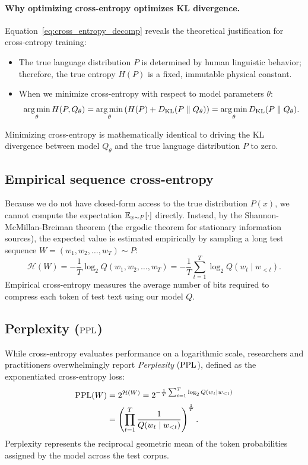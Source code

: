 \documentclass[../../main.tex]{subfiles}
\begin{document}
\paragraph{Why optimizing cross-entropy optimizes KL divergence.}
Equation~\eqref{eq:cross_entropy_decomp} reveals the theoretical justification for cross-entropy training:
\begin{itemize}
    \item The true language distribution $P$ is determined by human linguistic behavior; therefore, the true entropy $H(P)$ is a fixed, immutable physical constant.
    \item When we minimize cross-entropy with respect to model parameters $\theta$:
    \begin{equation}
    \label{eq:mle_equivalence}
    \operatorname*{\mathrm{arg\,min}}_\theta H(P, Q_\theta) = \operatorname*{\mathrm{arg\,min}}_\theta \left( H(P) + D_{\text{KL}}(P \parallel Q_\theta) \right) = \operatorname*{\mathrm{arg\,min}}_\theta D_{\text{KL}}(P \parallel Q_\theta).
    \end{equation}
\end{itemize}
Minimizing cross-entropy is mathematically identical to driving the KL divergence between model $Q_\theta$ and the true language distribution $P$ to zero.

\subsection{Empirical sequence cross-entropy}
Because we do not have closed-form access to the true distribution $P(x)$, we cannot compute the expectation $\operatorname*{\mathbb{E}}_{x \sim P}[\cdot]$ directly. Instead, by the Shannon-McMillan-Breiman theorem (the ergodic theorem for stationary information sources), the expected value is estimated empirically by sampling a long test sequence $W = (w_1, w_2, \dots, w_T) \sim P$:
\begin{equation}
\label{eq:empirical_cross_entropy}
\mathcal{H}(W) = - \frac{1}{T} \log_2 Q(w_1, w_2, \dots, w_T) = - \frac{1}{T} \sum_{t=1}^T \log_2 Q(w_t \mid w_{<t}).
\end{equation}
Empirical cross-entropy measures the average number of bits required to compress each token of test text using our model $Q$.

\subsection{Perplexity (\texorpdfstring{$\mathrm{PPL}$}{PPL})}
While cross-entropy evaluates performance on a logarithmic scale, researchers and practitioners overwhelmingly report \emph{Perplexity} ($\mathrm{PPL}$), defined as the exponentiated cross-entropy loss:
\begin{align}
\mathrm{PPL}(W) &= 2^{\mathcal{H}(W)} = 2^{-\frac{1}{T} \sum_{t=1}^T \log_2 Q(w_t \mid w_{<t})} \label{eq:ppl_base2} \\
&= \left( \prod_{t=1}^T \frac{1}{Q(w_t \mid w_{<t})} \right)^{\frac{1}{T}}. \label{eq:ppl_geometric}
\end{align}
Perplexity represents the reciprocal geometric mean of the token probabilities assigned by the model across the test corpus.
\end{document}
